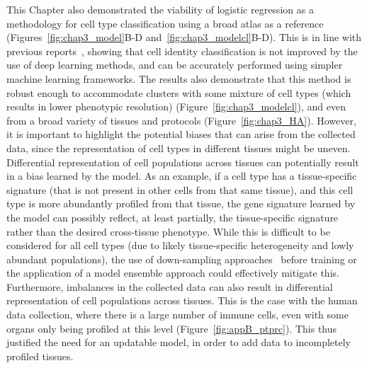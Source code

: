 This Chapter also demonstrated the viability of logistic regression as a methodology for cell type classification using a broad atlas as a reference (Figures~\ref{fig:chap3_model}B-D and~\ref{fig:chap3_modelcl}B-D). This is in line with previous reports~\citep{kohler_deep_2019,abdelaal_comparison_2019}, showing that cell identity classification is not improved by the use of deep learning methods, and can be accurately performed using simpler machine learning frameworks. The results also demonstrate that this method is robust enough to accommodate clusters with some mixture of cell types (which results in lower phenotypic resolution) (Figure~\ref{fig:chap3_modelcl}), and even from a broad variety of tissues and protocols (Figure~\ref{fig:chap3_HA}). However, it is important to highlight the potential biases that can arise from the collected data, since the representation of cell types in different tissues might be uneven. Differential representation of cell populations across tissues can potentially result in a bias learned by the model. As an example, if a cell type has a tissue-specific signature (that is not present in other cells from that same tissue), and this cell type is more abundantly profiled from that tissue, the gene signature learned by the model can possibly reflect, at least partially, the tissue-specific signature rather than the desired cross-tissue phenotype. While this is difficult to be considered for all cell types (due to likely tissue-specific heterogeneity and lowly abundant populations), the use of down-sampling approaches~\citep{wong_understanding_2016,hie_geometric_2019} before training or the application of a model ensemble approach could effectively mitigate this. Furthermore, imbalances in the collected data can also result in differential representation of cell populations across tissues. This is the case with the human data collection, where there is a large number of immune cells, even with some organs only being profiled at this level (Figure~\ref{fig:appB_ptprc}). This thus justified the need for an updatable model, in order to add data to incompletely profiled tissues.

